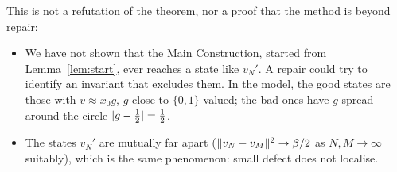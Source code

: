 This is not a refutation of the theorem, nor a proof that the method is beyond repair:
\begin{itemize}[leftmargin=2em]
\item We have not shown that the Main Construction, started from Lemma~\ref{lem:start}, ever
reaches a state like $v_N'$. A repair could try to identify an invariant that excludes them.
In the model, the good states are those with $v\approx x_0g$, $g$ close to $\{0,1\}$-valued;
the bad ones have $g$ spread around the circle $\lvert g-\frac12\rvert=\frac12$.
\item The states $v_N'$ are mutually far apart ($\lVert v_N-v_M\rVert^2\to\beta/2$ as
$N,M\to\infty$ suitably), which is the same phenomenon: small defect does not localise.
\end{itemize}
